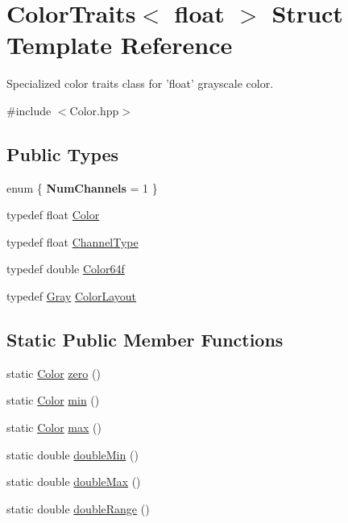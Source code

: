 \hypertarget{struct_d_o_1_1_color_traits_3_01float_01_4}{\section{Color\-Traits$<$ float $>$ Struct Template Reference}
\label{struct_d_o_1_1_color_traits_3_01float_01_4}
}


Specialized color traits class for 'float' grayscale color.  




{\ttfamily \#include $<$Color.\-hpp$>$}

\subsection*{Public Types}
\begin{DoxyCompactItemize}
\item 
enum \{ {\bfseries Num\-Channels} = 1
 \}
\item 
typedef float \hyperlink{struct_d_o_1_1_color_traits_3_01float_01_4_a84e40a2a68501ee9065154219636502d}{Color}
\item 
typedef float \hyperlink{struct_d_o_1_1_color_traits_3_01float_01_4_ad57b2d00f790a83a293e9712d5c1805c}{Channel\-Type}
\item 
typedef double \hyperlink{struct_d_o_1_1_color_traits_3_01float_01_4_a9a301fd8ba0a7225e38351d3e5b2e4d3}{Color64f}
\item 
typedef \hyperlink{struct_d_o_1_1_gray}{Gray} \hyperlink{struct_d_o_1_1_color_traits_3_01float_01_4_a7c9d599cfa0d1404784fbe60e6bcfd24}{Color\-Layout}
\end{DoxyCompactItemize}
\subsection*{Static Public Member Functions}
\begin{DoxyCompactItemize}
\item 
static \hyperlink{struct_d_o_1_1_color_traits_3_01float_01_4_a84e40a2a68501ee9065154219636502d}{Color} \hyperlink{struct_d_o_1_1_color_traits_3_01float_01_4_a57b00f8db42515f404e06ab933932125}{zero} ()
\item 
static \hyperlink{struct_d_o_1_1_color_traits_3_01float_01_4_a84e40a2a68501ee9065154219636502d}{Color} \hyperlink{struct_d_o_1_1_color_traits_3_01float_01_4_a1cd81f912af766f8004e4d5a82a7128b}{min} ()
\item 
static \hyperlink{struct_d_o_1_1_color_traits_3_01float_01_4_a84e40a2a68501ee9065154219636502d}{Color} \hyperlink{struct_d_o_1_1_color_traits_3_01float_01_4_aded391d5e231096e135e08760c0fbeb6}{max} ()
\item 
static double \hyperlink{struct_d_o_1_1_color_traits_3_01float_01_4_aa122aba748bfd453a27d2c30b368dbc3}{double\-Min} ()
\item 
static double \hyperlink{struct_d_o_1_1_color_traits_3_01float_01_4_ab9fb6b1bb12e23b725453a69f6193c30}{double\-Max} ()
\item 
static double \hyperlink{struct_d_o_1_1_color_traits_3_01float_01_4_aed64f95e634b8dac0ae5a0aed2b45740}{double\-Range} ()
\end{DoxyCompactItemize}


